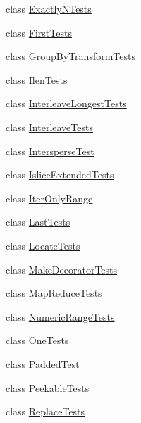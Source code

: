 \begin{DoxyCompactItemize}
\item 
class \hyperlink{classmore__itertools_1_1tests_1_1test__more_1_1_exactly_n_tests}{Exactly\+N\+Tests}
\item 
class \hyperlink{classmore__itertools_1_1tests_1_1test__more_1_1_first_tests}{First\+Tests}
\item 
class \hyperlink{classmore__itertools_1_1tests_1_1test__more_1_1_group_by_transform_tests}{Group\+By\+Transform\+Tests}
\item 
class \hyperlink{classmore__itertools_1_1tests_1_1test__more_1_1_ilen_tests}{Ilen\+Tests}
\item 
class \hyperlink{classmore__itertools_1_1tests_1_1test__more_1_1_interleave_longest_tests}{Interleave\+Longest\+Tests}
\item 
class \hyperlink{classmore__itertools_1_1tests_1_1test__more_1_1_interleave_tests}{Interleave\+Tests}
\item 
class \hyperlink{classmore__itertools_1_1tests_1_1test__more_1_1_intersperse_test}{Intersperse\+Test}
\item 
class \hyperlink{classmore__itertools_1_1tests_1_1test__more_1_1_islice_extended_tests}{Islice\+Extended\+Tests}
\item 
class \hyperlink{classmore__itertools_1_1tests_1_1test__more_1_1_iter_only_range}{Iter\+Only\+Range}
\item 
class \hyperlink{classmore__itertools_1_1tests_1_1test__more_1_1_last_tests}{Last\+Tests}
\item 
class \hyperlink{classmore__itertools_1_1tests_1_1test__more_1_1_locate_tests}{Locate\+Tests}
\item 
class \hyperlink{classmore__itertools_1_1tests_1_1test__more_1_1_make_decorator_tests}{Make\+Decorator\+Tests}
\item 
class \hyperlink{classmore__itertools_1_1tests_1_1test__more_1_1_map_reduce_tests}{Map\+Reduce\+Tests}
\item 
class \hyperlink{classmore__itertools_1_1tests_1_1test__more_1_1_numeric_range_tests}{Numeric\+Range\+Tests}
\item 
class \hyperlink{classmore__itertools_1_1tests_1_1test__more_1_1_one_tests}{One\+Tests}
\item 
class \hyperlink{classmore__itertools_1_1tests_1_1test__more_1_1_padded_test}{Padded\+Test}
\item 
class \hyperlink{classmore__itertools_1_1tests_1_1test__more_1_1_peekable_tests}{Peekable\+Tests}
\item 
class \hyperlink{classmore__itertools_1_1tests_1_1test__more_1_1_replace_tests}{Replace\+Tests}

\end{DoxyCompactItemize}
